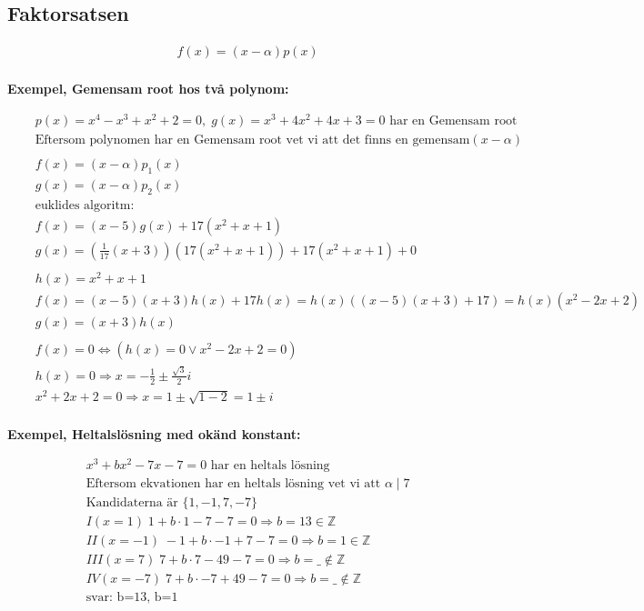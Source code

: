 \newpage

\subsection{Faktorsatsen}
\begin{align*} 
  &\quad  f(x) = (x - \alpha)p(x) \\
\end{align*}

\textbf{Exempel, Gemensam root hos två polynom:}\par
\begin{align*}
  &\quad  p(x)=x^4-x^3+x^2+2=0,\; g(x)=x^3+4x^2+4x+3=0 \text{ har en Gemensam root} \\
  &\quad  \text{Eftersom polynomen har en Gemensam root vet vi att det finns en gemensam} (x-\alpha) \\
  &\quad  \\
  &\quad  f(x)=(x-\alpha)p_1(x) \\  
  &\quad  g(x)=(x-\alpha)p_2(x) \\  
  &\quad  \text{euklides algoritm:} \\
  &\quad  f(x)=(x-5)g(x)+17(x^2+x+1) \\
  &\quad  g(x)=(\frac{1}{17}(x+3))(17(x^2+x+1))+17(x^2+x+1) + 0 \\
  &\quad  \\
  &\quad  h(x)=x^2+x+1 \\
  &\quad  f(x)= (x-5)(x+3)h(x)+17h(x) = h(x)((x-5)(x+3)+17) = h(x)(x^2-2x+2) \\
  &\quad  g(x)= (x+3)h(x) \\ 
  &\quad  \\
  &\quad  f(x)=0 \Leftrightarrow (h(x)=0 \lor x^2-2x+2=0) \\
  &\quad  h(x)=0 \Rightarrow x=-\frac{1}{2} \pm \frac{\sqrt{3}}{2}i \\
  &\quad  x^2+2x+2=0 \Rightarrow x=1 \pm \sqrt{1-2}=1 \pm i \\
\end{align*}


\textbf{Exempel, Heltalslösning med okänd konstant:}\par
\begin{align*}
  &\quad  x^3 + bx^2 - 7x -7 = 0 \text{ har en heltals lösning} \\
  &\quad  \text{Eftersom ekvationen har en heltals lösning vet vi att } \alpha \mid 7\\
  &\quad  \text{Kandidaterna är } \{1,-1,7,-7 \} \\
  &\quad  I   (x= 1) \;  1 + b\cdot  1 - 7 -7 = 0 \Rightarrow b=13 \in \mathbb{Z} \\
  &\quad  II  (x=-1) \; -1 + b\cdot -1 + 7 -7 = 0 \Rightarrow b= 1 \in \mathbb{Z} \\
  &\quad  III (x= 7) \;  7 + b\cdot  7 -49 -7 = 0 \Rightarrow b=\_ \notin \mathbb{Z} \\
  &\quad  IV  (x=-7) \;  7 + b\cdot -7 +49 -7 = 0 \Rightarrow b=\_ \notin \mathbb{Z} \\
  &\quad  \text{svar: b=13, b=1}
\end{align*}

